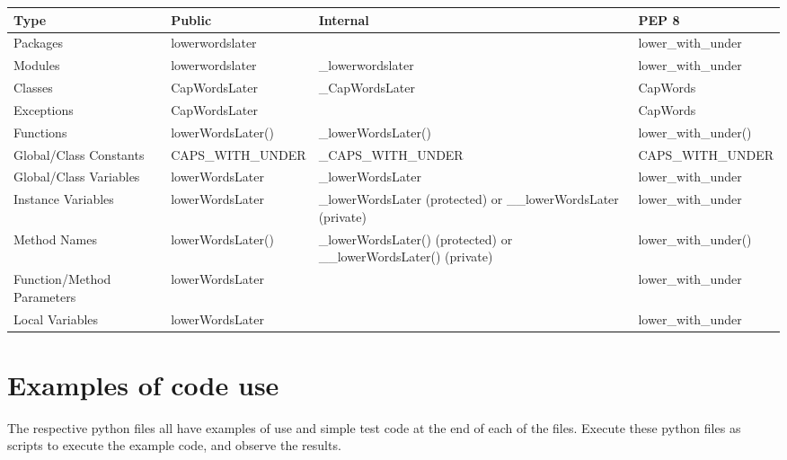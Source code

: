\documentclass[a4paper,10pt,english]{sphinxmanual}
\begin{document}
\begin{tabulary}{\linewidth}{|L|L|L|L|}
\hline
\textsf{\relax 
Type
} & \textsf{\relax 
Public
} & \textsf{\relax 
Internal
} & \textsf{\relax 
PEP 8
}\\
\hline
Packages
 & 
lowerwordslater
 &  & 
lower\_with\_under
\\

Modules
 & 
lowerwordslater
 & 
\_lowerwordslater
 & 
lower\_with\_under
\\

Classes
 & 
CapWordsLater
 & 
\_CapWordsLater
 & 
CapWords
\\

Exceptions
 & 
CapWordsLater
 &  & 
CapWords
\\

Functions
 & 
lowerWordsLater()
 & 
\_lowerWordsLater()
 & 
lower\_with\_under()
\\

Global/Class Constants
 & 
CAPS\_WITH\_UNDER
 & 
\_CAPS\_WITH\_UNDER
 & 
CAPS\_WITH\_UNDER
\\

Global/Class Variables
 & 
lowerWordsLater
 & 
\_lowerWordsLater
 & 
lower\_with\_under
\\

Instance Variables
 & 
lowerWordsLater
 & 
\_lowerWordsLater (protected) or \_\_lowerWordsLater (private)
 & 
lower\_with\_under
\\

Method Names
 & 
lowerWordsLater()
 & 
\_lowerWordsLater() (protected) or \_\_lowerWordsLater() (private)
 & 
lower\_with\_under()
\\

Function/Method Parameters
 & 
lowerWordsLater
 &  & 
lower\_with\_under
\\

Local Variables
 & 
lowerWordsLater
 &  & 
lower\_with\_under
\\
\hline\end{tabulary}



\chapter{Examples of code use}
\label{index:examples-of-code-use}
The respective python files all have examples of use and simple test code at
the end of each of the files. Execute these python files as scripts to execute
the example code, and observe the results.
\end{document}
